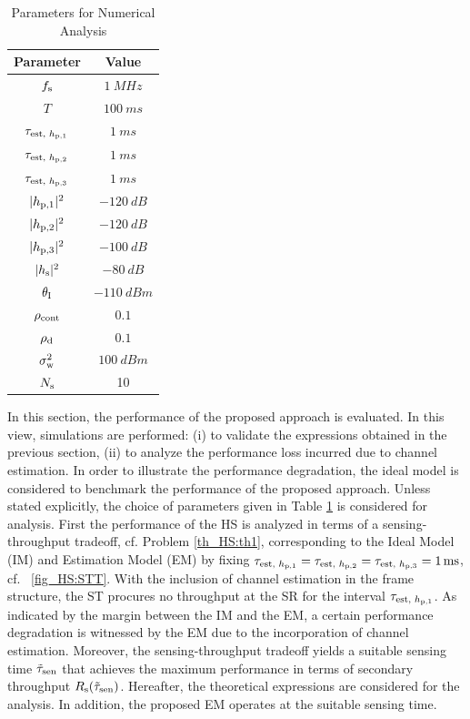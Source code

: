 \begin{table}
\renewcommand{\arraystretch}{1.4}
\caption{Parameters for Numerical Analysis}
\label{tb_HS:tb2}
\centering
\begin{tabular}{c||c}
\hline
\bfseries Parameter & \bfseries Value \\
\hline\hline
$f_{\text{s}}$ & $\SI{1}{MHz}$ \\ 
$T$ & $\SI{100}{ms}$ \\ 
$\tau_{\text{est, $h_{\text{p,1}}$}}$ & $\SI{1}{ms}$ \\
$\tau_{\text{est, $h_{\text{p,2}}$}}$ & $\SI{1}{ms}$ \\
$\tau_{\text{est, $h_{\text{p,3}}$}}$ & $\SI{1}{ms}$ \\
$|h_{\text{p,1}}|^2$ & $\SI{-120}{dB}$ \\ 
$|h_{\text{p,2}}|^2$ & $\SI{-120}{dB}$ \\ 
$|h_{\text{p,3}}|^2$ & $\SI{-100}{dB}$ \\ 
$|h_{\text{s}}|^2$ & $\SI{-80}{dB}$ \\ 
$\theta_{\text{I}}$ & $\SI{-110}{dBm}$ \\ 
$\rho_{\text{cont}}$ & $0.1$ \\
$\rho_{\text{d}}$ & $0.1$ \\
$\sigma^2_{\text{w}}$ & $\SI{100}{dBm}$ \\
$N_{\text{s}}$ & 10 \\ \hline
\end{tabular}
\end{table}

In this section, the performance of the proposed approach is evaluated. In this view, simulations are performed: (i) to validate the expressions obtained in the previous section, (ii) to analyze the performance loss incurred due to channel estimation. In order to illustrate the performance degradation, the ideal model is considered to benchmark the performance of the proposed approach. Unless stated explicitly, the choice of parameters given in Table \ref{tb_HS:tb2} is considered for analysis. First the performance of the HS is analyzed in terms of a sensing-throughput tradeoff, cf. Problem \ref{th_HS:th1}, corresponding to the Ideal Model (IM) and Estimation Model (EM) by fixing $\tau_{\text{est, $h_{\text{p,1}}$}} = \tau_{\text{est, $h_{\text{p,2}}$}} =  \tau_{\text{est, $h_{\text{p,3}}$}} = \SI{1}{ms}$, cf. \figurename~\ref{fig_HS:STT}. With the inclusion of channel estimation in the frame structure, the ST procures no throughput at the SR for the interval $\tau_{\text{est, $h_{\text{p,1}}$}}$. As indicated by the margin between the IM and the EM, a certain performance degradation is witnessed by the EM due to the incorporation of channel estimation. Moreover, the sensing-throughput tradeoff yields a suitable sensing time $\tilde{\tau}_{\text{sen}}$ that achieves the maximum performance in terms of secondary throughput $R_{\text{s}}(\tilde{\tau}_{\text{sen}})$. Hereafter, the theoretical expressions are considered for the analysis. In addition, the proposed EM operates at the suitable sensing time. 


